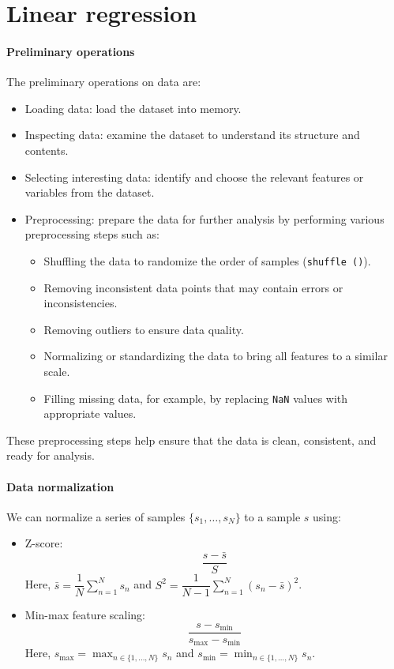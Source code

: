\section{Linear regression}

\paragraph*{Preliminary operations}
The preliminary operations on data are: 
\begin{itemize}
    \item Loading data: load the dataset into memory.
    \item Inspecting data: examine the dataset to understand its structure and contents.
    \item Selecting interesting data: identify and choose the relevant features or variables from the dataset.
    \item Preprocessing: prepare the data for further analysis by performing various preprocessing steps such as:
        \begin{itemize}
            \item Shuffling the data to randomize the order of samples (\texttt{shuffle ()}).
            \item Removing inconsistent data points that may contain errors or inconsistencies.
            \item Removing outliers to ensure data quality.
            \item Normalizing or standardizing the data to bring all features to a similar scale.
            \item Filling missing data, for example, by replacing \texttt{NaN} values with appropriate values.
        \end{itemize}
\end{itemize}
These preprocessing steps help ensure that the data is clean, consistent, and ready for analysis.

\paragraph*{Data normalization}
We can normalize a series of samples $\{ s_1,\dots,s_N \}$ to a sample $s$ using: 
\begin{itemize}
    \item Z-score: 
        \[\dfrac{s-\bar{s}}{S}\]
        Here, $\bar{s}=\dfrac{1}{N}\sum_{n=1}^N s_n$ and $S^2=\dfrac{1}{N-1}\sum_{n=1}^N{\left(s_n-\bar{s}\right)}^2$. 
    \item Min-max feature scaling: 
        \[\dfrac{s-s_{\min}}{s_{\max}-s_{\min}}\]
        Here, $s_{\max}=\max_{n\in\{1,\dots,N\}}s_n$ and $s_{\min}=\min_{n\in\{1,\dots,N\}}s_n$. 
\end{itemize}

